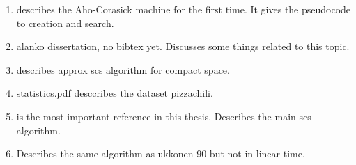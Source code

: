 \documentclass[english,twoside,censored,csm,algorithms-track-2020]{HYthesisML}
\theoremstyle{plain}
\theoremstyle{definition}
\begin{document}
  \begin{enumerate}
  \item \citep{Aho75} describes the Aho-Corasick machine for the first time. It gives the pseudocode to creation and search.
  \item alanko dissertation, no bibtex yet. Discusses some things related to this topic.
  \item \citep{Alanko17} describes approx scs algorithm for compact space.
  \item statistics.pdf desccribes the dataset pizzachili.
  \item \citep{Ukkonen90} is the most important reference in this thesis. Describes the main scs algorithm.
  \item \citep{Tarhio88} Describes the same algorithm as ukkonen 90 but not in linear time.
  \end{enumerate}











\cleardoublepage                          %
{}  %
\printbibliography

\backmatter

%
%
%

\begin{appendices}

%



\end{appendices}
\end{document}
